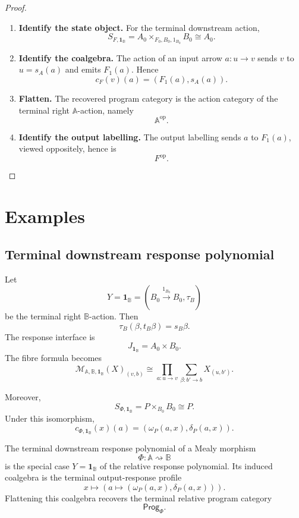 \begin{proof}
\leavevmode
\begin{enumerate}
\item \textbf{Identify the state object.}
For the terminal downstream action,
\[
S_{F,\mathbf 1_{\mathbb B}}
=
A_0\times_{F_0,B_0,1_{B_0}}B_0
\cong A_0.
\]

\item \textbf{Identify the coalgebra.}
The action of an input arrow \(a:u\to v\) sends \(v\) to \(u=s_A(a)\) and
emits \(F_1(a)\).  Hence
\[
c_F(v)(a)=(F_1(a),s_A(a)).
\]

\item \textbf{Flatten.}
The recovered program category is the action category of the terminal right
\(\mathbb A\)-action, namely
\[
\mathbb A^{\mathrm{op}}.
\]

\item \textbf{Identify the output labelling.}
The output labelling sends \(a\) to \(F_1(a)\), viewed oppositely, hence is
\[
F^{\mathrm{op}}.
\]
\end{enumerate}
\end{proof}

\section{Examples}
\label{sec:poly-relative-examples}

\subsection{Terminal downstream response polynomial}
\label{subsec:poly-relative-example-terminal-downstream-response}

Let
\[
Y=\mathbf 1_{\mathbb B}
=
(B_0\xrightarrow{1_{B_0}}B_0,\tau_B)
\]
be the terminal right \(\mathbb B\)-action.  Then
\[
\tau_B(\beta,t_B\beta)=s_B\beta.
\]
The response interface is
\[
J_{\mathbf 1_{\mathbb B}}=A_0\times B_0.
\]
The fibre formula becomes
\[
\mathcal M_{\mathbb A,\mathbb B,\mathbf 1_{\mathbb B}}(X)_{(v,b)}
\cong
\prod_{a:u\to v}
\sum_{\beta:b'\to b}
X_{(u,b')}.
\]

Moreover,
\[
S_{\Phi,\mathbf 1_{\mathbb B}}
=
P\times_{B_0}B_0
\cong P.
\]
Under this isomorphism,
\[
c_{\Phi,\mathbf 1_{\mathbb B}}(x)(a)
=
(\omega_P(a,x),\delta_P(a,x)).
\]

\begin{corollary}
\label{cor:poly-relative-terminal-mealy-polynomial}
The terminal downstream response polynomial of a Mealy morphism
\[
\Phi:\mathbb A\rightsquigarrow\mathbb B
\]
is the special case \(Y=\mathbf 1_{\mathbb B}\) of the relative response
polynomial.  Its induced coalgebra is the terminal output-response profile
\[
x
\longmapsto
\left(
a
\longmapsto(\omega_P(a,x),\delta_P(a,x))
\right).
\]
Flattening this coalgebra recovers the terminal relative program category
\[
\mathsf{Prog}_\Phi.
\]
\end{corollary}

